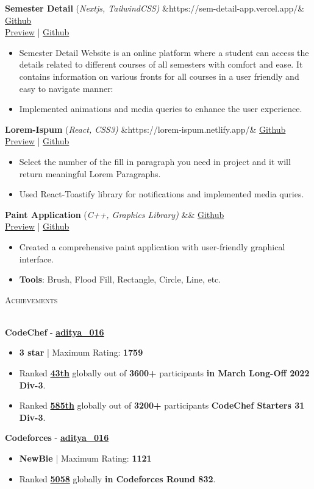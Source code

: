 \documentclass[10pt]{article}
\newcommand{\tinyBulletSep} { \vspace{1.2mm} }
\newcommand{\bulletSep} { \vspace{2.2mm} }
\newcommand{\sectionSep} { \vspace{3mm} }
\newcommand{\lineunder} {
    \vspace*{-8pt} \\
    \hspace*{-15pt} \hrulefill \\
}
\newcommand{\header} [1] {
    {\hspace*{-18pt}\vspace*{6pt} {
        \fontfamily{qcs}\selectfont \large \scshape #1
    }}
    \vspace*{-6pt} \lineunder
    \vspace{0.5mm}
}
\newcommand{\projectItem}[5]{
    {\textbf{#1}} {(\sl #2)}\hfill
    \ifx&#3&%
    \href{#4}{Github}\\
    \else
    \href{#3}{Preview} | \href{#4}{Github}\\
    \fi
    \begin{itemize}
        #5
    \end{itemize}
}
\begin{document}
\projectItem{Semester Detail}{Nextjs, TailwindCSS}{https://sem-detail-app.vercel.app/}{https://github.com/p-chhabra/Semester-Detail-Website/tree/dev}{
    \item Semester Detail Website is an online platform where a student can access the
details related to different courses of all semesters with comfort and ease. It
contains information on various fronts for all courses in a user friendly and easy
to navigate manner:

    \item Implemented animations and media queries to enhance the user experience.
}\bulletSep

\projectItem{Lorem-Ispum}{React, CSS3}{https://lorem-ispum.netlify.app/}{https://github.com/devloper016/Lorem-Ispum}{
    \item Select the number of the fill in paragraph you need in project and it will return meaningful Lorem Paragraphs.
    \item Used React-Toastify library for notifications and implemented media quries.
}
\bulletSep

\projectItem{Paint Application}{C++, Graphics Library}{}{https://github.com/devloper016/paint/tree/main}{
    \item Created a comprehensive paint application with {user-friendly graphical interface}.
    \item \textbf{Tools}: Brush, Flood Fill, Rectangle, Circle, Line, etc.
}
\bulletSep

\sectionSep

\header{Achievements}
\textbf{CodeChef} - \textbf{\href{https://www.codechef.com/users/aditya_016}{aditya\_016}}
\begin{itemize}
    \item \textbf{3 star} | Maximum Rating: \textbf{1759}
    \item Ranked \textbf{\href{https://www.codechef.com/rankings/MARCH222C?itemsPerPage=100&order=asc&page=1&sortBy=rank}{43th}} globally out of \textbf{3600+} participants \textbf{in March Long-Off 2022 Div-3}.
    \item Ranked \textbf{\href{https://www.codechef.com/rankings/START31C?itemsPerPage=100&order=asc&page=1&sortBy=rank}{585th}} globally out of \textbf{3200+} participants \textbf{CodeChef Starters 31 Div-3}.
\end{itemize}
\tinyBulletSep

\textbf{Codeforces} - \textbf{\href{https://codeforces.com/profile/Sergeant07}{aditya\_016}}
\begin{itemize}
    \item \textbf{NewBie} | Maximum Rating: \textbf{1121}
    \item Ranked \textbf{\href{https://codeforces.com/contest/1747/standings/participant/143507811#p143507811}{5058}} globally  \textbf{in Codeforces Round 832}.
\end{itemize}
\tinyBulletSep
\end{document}
